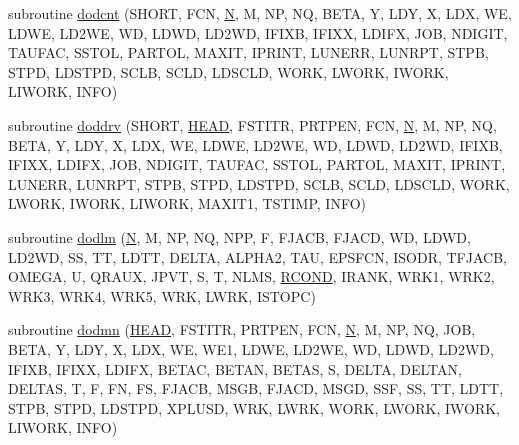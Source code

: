 \begin{DoxyCompactItemize}
\item 
subroutine \hyperlink{d__odr_8f_a38df3f9cded65fb915d30eb78164c91f}{dodcnt} (S\+H\+O\+R\+T, F\+C\+N, \hyperlink{polmisc_8c_a0240ac851181b84ac374872dc5434ee4}{N}, M, N\+P, N\+Q, B\+E\+T\+A, Y, L\+D\+Y, X, L\+D\+X, W\+E, L\+D\+W\+E, L\+D2\+W\+E, W\+D, L\+D\+W\+D, L\+D2\+W\+D, I\+F\+I\+X\+B, I\+F\+I\+X\+X, L\+D\+I\+F\+X, J\+O\+B, N\+D\+I\+G\+I\+T, T\+A\+U\+F\+A\+C, S\+S\+T\+O\+L, P\+A\+R\+T\+O\+L, M\+A\+X\+I\+T, I\+P\+R\+I\+N\+T, L\+U\+N\+E\+R\+R, L\+U\+N\+R\+P\+T, S\+T\+P\+B, S\+T\+P\+D, L\+D\+S\+T\+P\+D, S\+C\+L\+B, S\+C\+L\+D, L\+D\+S\+C\+L\+D, W\+O\+R\+K, L\+W\+O\+R\+K, I\+W\+O\+R\+K, L\+I\+W\+O\+R\+K, I\+N\+F\+O)
\item 
subroutine \hyperlink{d__odr_8f_a5f39f6e536d450a21d4bbddaf56c2e43}{doddrv} (S\+H\+O\+R\+T, \hyperlink{superlu__enum__consts_8h_a9c99a6c403d30f227aa91cf3b10f6aa4a0b0955668575b21eb0ab2272aef49f76}{H\+E\+A\+D}, F\+S\+T\+I\+T\+R, P\+R\+T\+P\+E\+N, F\+C\+N, \hyperlink{polmisc_8c_a0240ac851181b84ac374872dc5434ee4}{N}, M, N\+P, N\+Q, B\+E\+T\+A, Y, L\+D\+Y, X, L\+D\+X, W\+E, L\+D\+W\+E, L\+D2\+W\+E, W\+D, L\+D\+W\+D, L\+D2\+W\+D, I\+F\+I\+X\+B, I\+F\+I\+X\+X, L\+D\+I\+F\+X, J\+O\+B, N\+D\+I\+G\+I\+T, T\+A\+U\+F\+A\+C, S\+S\+T\+O\+L, P\+A\+R\+T\+O\+L, M\+A\+X\+I\+T, I\+P\+R\+I\+N\+T, L\+U\+N\+E\+R\+R, L\+U\+N\+R\+P\+T, S\+T\+P\+B, S\+T\+P\+D, L\+D\+S\+T\+P\+D, S\+C\+L\+B, S\+C\+L\+D, L\+D\+S\+C\+L\+D, W\+O\+R\+K, L\+W\+O\+R\+K, I\+W\+O\+R\+K, L\+I\+W\+O\+R\+K, M\+A\+X\+I\+T1, T\+S\+T\+I\+M\+P, I\+N\+F\+O)
\item 
subroutine \hyperlink{d__odr_8f_a9e383388cba6dd167fb5401115e09109}{dodlm} (\hyperlink{polmisc_8c_a0240ac851181b84ac374872dc5434ee4}{N}, M, N\+P, N\+Q, N\+P\+P, F, F\+J\+A\+C\+B, F\+J\+A\+C\+D, W\+D, L\+D\+W\+D, L\+D2\+W\+D, S\+S, T\+T, L\+D\+T\+T, D\+E\+L\+T\+A, A\+L\+P\+H\+A2, T\+A\+U, E\+P\+S\+F\+C\+N, I\+S\+O\+D\+R, T\+F\+J\+A\+C\+B, O\+M\+E\+G\+A, U, Q\+R\+A\+U\+X, J\+P\+V\+T, S, T, N\+L\+M\+S, \hyperlink{superlu__enum__consts_8h_af00a42ecad444bbda75cde1b64bd7e72a9b5c151728d8512307565994c89919d5}{R\+C\+O\+N\+D}, I\+R\+A\+N\+K, W\+R\+K1, W\+R\+K2, W\+R\+K3, W\+R\+K4, W\+R\+K5, W\+R\+K, L\+W\+R\+K, I\+S\+T\+O\+P\+C)
\item 
subroutine \hyperlink{d__odr_8f_a026047a4d9c6ebb350867762b070a995}{dodmn} (\hyperlink{superlu__enum__consts_8h_a9c99a6c403d30f227aa91cf3b10f6aa4a0b0955668575b21eb0ab2272aef49f76}{H\+E\+A\+D}, F\+S\+T\+I\+T\+R, P\+R\+T\+P\+E\+N, F\+C\+N, \hyperlink{polmisc_8c_a0240ac851181b84ac374872dc5434ee4}{N}, M, N\+P, N\+Q, J\+O\+B, B\+E\+T\+A, Y, L\+D\+Y, X, L\+D\+X, W\+E, W\+E1, L\+D\+W\+E, L\+D2\+W\+E, W\+D, L\+D\+W\+D, L\+D2\+W\+D, I\+F\+I\+X\+B, I\+F\+I\+X\+X, L\+D\+I\+F\+X, B\+E\+T\+A\+C, B\+E\+T\+A\+N, B\+E\+T\+A\+S, S, D\+E\+L\+T\+A, D\+E\+L\+T\+A\+N, D\+E\+L\+T\+A\+S, T, F, F\+N, F\+S, F\+J\+A\+C\+B, M\+S\+G\+B, F\+J\+A\+C\+D, M\+S\+G\+D, S\+S\+F, S\+S, T\+T, L\+D\+T\+T, S\+T\+P\+B, S\+T\+P\+D, L\+D\+S\+T\+P\+D, X\+P\+L\+U\+S\+D, W\+R\+K, L\+W\+R\+K, W\+O\+R\+K, L\+W\+O\+R\+K, I\+W\+O\+R\+K, L\+I\+W\+O\+R\+K, I\+N\+F\+O)

\end{DoxyCompactItemize}
